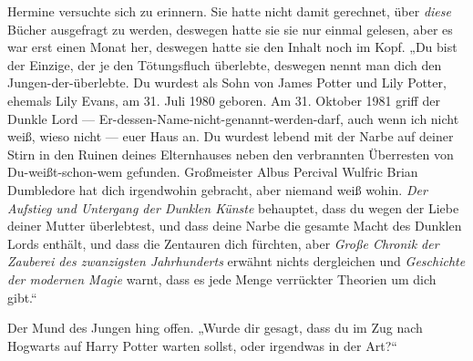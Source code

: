 Hermine versuchte sich zu erinnern. Sie hatte nicht damit gerechnet, über \emph{diese} Bücher ausgefragt zu werden, deswegen hatte sie sie nur einmal gelesen, aber es war erst einen Monat her, deswegen hatte sie den Inhalt noch im Kopf.
„Du bist der Einzige, der je den Tötungsfluch überlebte, deswegen nennt man dich den Jungen-der-überlebte. Du wurdest als Sohn von James Potter und Lily Potter, ehemals Lily Evans, am 31. Juli 1980 geboren. Am 31. Oktober 1981 griff der Dunkle Lord — Er-dessen-Name-nicht-genannt-werden-darf, auch wenn ich nicht weiß, wieso nicht — euer Haus an. Du wurdest lebend mit der Narbe auf deiner Stirn in den Ruinen deines Elternhauses neben den verbrannten Überresten von Du-weißt-schon-wem gefunden. Großmeister Albus Percival Wulfric Brian Dumbledore hat dich irgendwohin gebracht, aber niemand weiß wohin. \emph{Der Aufstieg und Untergang der Dunklen Künste} behauptet, dass du wegen der Liebe deiner Mutter überlebtest, und dass deine Narbe die gesamte Macht des Dunklen Lords enthält, und dass die Zentauren dich fürchten, aber \emph{Große Chronik der Zauberei des zwanzigsten Jahrhunderts} erwähnt nichts dergleichen und \emph{Geschichte der modernen Magie} warnt, dass es jede Menge verrückter Theorien um dich gibt.“

Der Mund des Jungen hing offen.
„Wurde dir gesagt, dass du im Zug nach Hogwarts auf Harry Potter warten sollst, oder irgendwas in der Art?“

